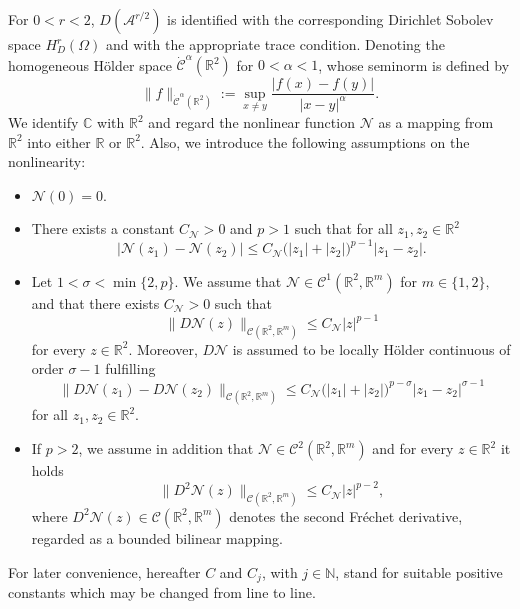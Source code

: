 \documentclass[a4paper,11pt]{article} %
\newcommand{\N}{\mathbb{N}}
\theoremstyle{remark}
\theoremstyle{definition}
\numberwithin{equation}{section}
\begin{document}
For \(0<r<2\), \(D(\mathcal{A}^{r/2})\) is identified with the corresponding Dirichlet Sobolev space \(H^r_D(\Omega)\) and with the appropriate trace condition. Denoting the homogeneous H\"older space $\dot{\mathcal{C}}^\alpha(\mathbb R^2)$ for $0<\alpha<1$, whose seminorm is defined by
$$
\|f\|_{\dot{\mathcal{C}}^\alpha(\mathbb R^2)}
:=
\sup_{x\neq y}
\frac{|f(x)-f(y)|}
{|x-y|^\alpha}.
$$
We identify \(\mathbb C\) with \(\mathbb R^2\) and regard the nonlinear function \(\mathcal N\) as a mapping from \(\mathbb R^2\) into either
\(\mathbb R\) or \(\mathbb R^2\). Also, we introduce the following assumptions on the nonlinearity:

\begin{itemize}

\item $\mathcal N(0)=0$.

\item There exists a constant \(C_{\mathcal N}>0\) and \(p>1\) such that for all \(z_1,z_2\in\mathbb R^2\)
\begin{equation}
\label{eq:N-Lip}
|\mathcal N(z_1)-\mathcal N(z_2)|
\le
C_{\mathcal N}
\bigl(|z_1|+|z_2|\bigr)^{p-1}
|z_1-z_2|.
\end{equation}

\item Let \(1<\sigma<\min\{2,p\}\). We assume that $
\mathcal N\in \mathcal C^1(\mathbb R^2,\mathbb R^m)$ for $m\in\{1,2\},
$
and that there exists \(C_{\mathcal N}>0\) such that
\begin{equation}
\label{eq:DN-growth}
\big\|D\mathcal N(z)\big\|_{\mathcal C(\mathbb R^2,\mathbb R^m)}
\le
C_{\mathcal N}|z|^{p-1}
\end{equation}
for every \(z\in\mathbb R^2\). Moreover, \(D\mathcal N\) is assumed to be locally H\"older continuous
of order \(\sigma-1\) fulfilling
\begin{equation*}
\big\|D\mathcal N(z_1)-D\mathcal N(z_2)\big\|_{\mathcal C(\mathbb R^2,\mathbb R^m)}
\le
C_{\mathcal N}
\bigl(|z_1|+|z_2|\bigr)^{p-\sigma}
|z_1-z_2|^{\sigma-1}
\end{equation*}
for all \(z_1,z_2\in\mathbb R^2\).

\item If \(p>2\), we assume in addition that $\mathcal N\in \mathcal C^2(\mathbb R^2,\mathbb R^m)$
and for every \(z\in\mathbb R^2\) it holds
\begin{equation}
\label{eq:D2N-growth}
\big\|D^2\mathcal N(z)\big\|_{\mathcal C(\mathbb R^2,\mathbb R^m)}
\le
C_{\mathcal N}|z|^{p-2},
\end{equation}
where $D^2\mathcal N(z)\in
\mathcal C(\mathbb R^2,\mathbb R^m)$ denotes the second Fr\'echet derivative, regarded as a bounded bilinear mapping.
\end{itemize}
For later convenience, hereafter $C$ and $C_j$, with $j\in\N$, stand for suitable positive constants which may be changed from line to line.
\end{document}

